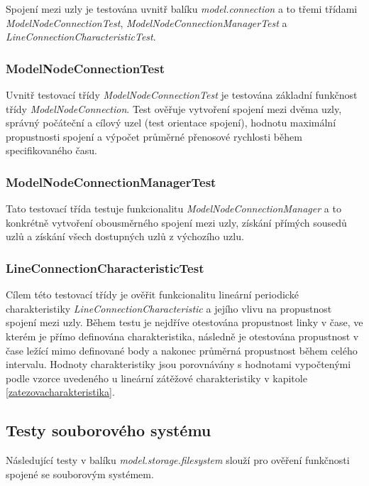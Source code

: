 \documentclass[czech,DP]{thesiskiv}
\begin{document}
Spojení mezi uzly je testována uvnitř balíku \textit{model.connection} a to třemi třídami \textit{ModelNodeConnectionTest}, \textit{ModelNodeConnectionManagerTest} a \textit{LineConnectionCharacteristicTest}.

\subsubsection*{ModelNodeConnectionTest}

Uvnitř testovací třídy \textit{ModelNodeConnectionTest} je testována základní funkčnost třídy \textit{ModelNodeConnection}. Test ověřuje vytvoření spojení mezi dvěma uzly, správný počáteční a cílový uzel (test orientace spojení), hodnotu maximální propustnosti spojení a výpočet průměrné přenosové rychlosti během specifikovaného času.

\subsubsection*{ModelNodeConnectionManagerTest}

Tato testovací třída testuje funkcionalitu \textit{ModelNodeConnectionManager} a to konkrétně vytvoření obousměrného spojení mezi uzly, získání přímých sousedů uzlů a získání všech dostupných uzlů z výchozího uzlu.

\subsubsection*{LineConnectionCharacteristicTest}

Cílem této testovací třídy je ověřit funkcionalitu lineární periodické charakteristiky \textit{LineConnectionCharacteristic} a jejího vlivu na propustnost spojení mezi uzly. Během testu je nejdříve otestována propustnost linky v čase, ve kterém je přímo definována charakteristika, následně je otestována propustnost v čase ležící mimo definované body a nakonec průměrná propustnost během celého intervalu. Hodnoty charakteristiky jsou porovnávány s hodnotami vypočtenými podle vzorce uvedeného u lineární zátěžové charakteristiky v kapitole \ref{zatezovacharakteristika}.

\subsection{Testy souborového systému}

Následující testy v balíku \textit{model.storage.filesystem} slouží pro ověření funkčnosti spojené se souborovým systémem.
\end{document}
